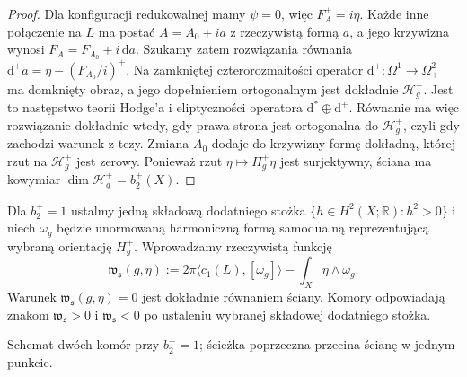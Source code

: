 \documentclass[11pt,a4paper]{report}
\numberwithin{equation}{section}
\theoremstyle{plain}
\theoremstyle{definition}
\theoremstyle{remark}
\begin{document}
\begin{proof}
Dla konfiguracji redukowalnej mamy $\psi=0$, więc
$F_A^+=i\eta$. Każde inne połączenie na $L$ ma postać
$A=A_0+ia$ z rzeczywistą formą $a$, a jego krzywizna
wynosi $F_A=F_{A_0}+i\,\mathrm da$.
Szukamy zatem rozwiązania równania
$\mathrm d^+a=\eta-(F_{A_0}/i)^+$.
Na zamkniętej czterorozmaitości operator
$\mathrm d^+:\Omega^1\to\Omega^2_+$ ma domknięty obraz,
a jego dopełnieniem ortogonalnym jest dokładnie
$\mathcal H_g^+$. Jest to następstwo teorii Hodge'a
i eliptyczności operatora $\mathrm d^*\oplus\mathrm d^+$.
Równanie ma więc rozwiązanie dokładnie wtedy, gdy
prawa strona jest ortogonalna do $\mathcal H_g^+$,
czyli gdy zachodzi warunek z tezy.
Zmiana $A_0$ dodaje do krzywizny formę dokładną,
której rzut na $\mathcal H_g^+$ jest zerowy.
Ponieważ rzut $\eta\mapsto\Pi_g^+\eta$ jest surjektywny,
ściana ma kowymiar $\dim\mathcal H_g^+=b_2^+(X)$.
\end{proof}

Dla $b_2^+=1$ ustalmy jedną składową dodatniego stożka
$\{h\in H^2(X;\mathbb R):h^2>0\}$ i niech
$\omega_g$ będzie unormowaną harmoniczną formą
samodualną reprezentującą wybraną orientację $H_g^+$.
Wprowadzamy rzeczywistą funkcję
\[
\mathfrak w_{\mathfrak s}(g,\eta)
:=2\pi\langle c_1(L),[\omega_g]\rangle
-\int_X\eta\wedge\omega_g.
\]
Warunek $\mathfrak w_{\mathfrak s}(g,\eta)=0$ jest dokładnie
równaniem ściany. Komory odpowiadają znakom
$\mathfrak w_{\mathfrak s}>0$ i $\mathfrak w_{\mathfrak s}<0$
po ustaleniu wybranej składowej dodatniego stożka.

\begin{center}

{\footnotesize Schemat dwóch komór przy $b_2^+=1$; ścieżka poprzeczna
przecina ścianę w jednym punkcie.}
\end{center}
\end{document}

